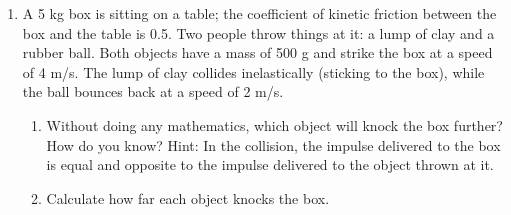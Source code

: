\documentclass[12pt]{article}
\begin{document}
\begin{enumerate}
\item{A 5 kg box is sitting on a table; the coefficient of kinetic friction between the box and the table is 0.5.
  Two people throw things at it: a lump of clay and a rubber ball. Both objects have a mass of 500 g and strike the box at a speed of 4 m/s. The lump of clay collides inelastically (sticking to the box), while the ball bounces back at a speed of 2 m/s.}
  \begin{enumerate}
    \item{Without doing any mathematics, which object will knock the box further? How do you know? Hint: In the collision, the impulse delivered to the box is equal and opposite to the impulse delivered to the object thrown at it.}
\vspace{1in}
    \item{Calculate how far each object knocks the box.}
  \end{enumerate}
  \end{enumerate}

   
\end{document}
